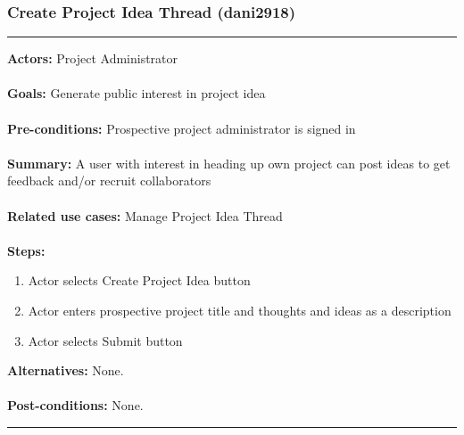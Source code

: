 \documentclass[11pt]{report}
\begin{document}
\subsubsection{Create Project Idea Thread (dani2918)}
\vspace{2pt}
\hrule
\vspace{8pt}
 \textbf{Actors:} Project Administrator \\ \\
\textbf{Goals:} Generate public interest in project idea  \\ \\
 \textbf{Pre-conditions:} Prospective project administrator is signed in  \\ \\
 \textbf{Summary:}  A user with interest in heading up own project can post ideas to get feedback and/or recruit collaborators \\ \\
\textbf{Related use cases:} Manage Project Idea Thread \\ \\
\textbf{Steps:} \begin{enumerate}
  \item Actor selects Create Project Idea button
  \item Actor enters prospective project title and thoughts and ideas as a description
  \item Actor selects Submit button
 \end{enumerate}
 \textbf{Alternatives:} None. \\ \\
 \textbf{Post-conditions:} None. \\
\vspace{8pt}
\hrule
\newpage
\end{document}
